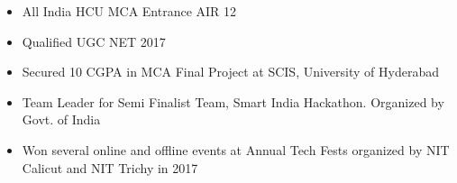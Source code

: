 {}
\divider

\smallskip
\begin{itemize}
\item All India HCU MCA Entrance AIR 12
\smallskip
\item Qualified UGC NET 2017
\smallskip
\item Secured 10 CGPA in MCA Final Project at SCIS, University of Hyderabad
\smallskip
\item Team Leader for Semi Finalist Team, Smart India Hackathon. Organized by Govt. of India
\smallskip
\item Won several online and offline events at Annual Tech Fests organized by NIT Calicut and NIT Trichy in 2017
\end{itemize}


